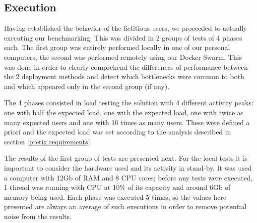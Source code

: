 \documentclass[12pt]{article}
\begin{document}
\subsection{Execution} \label{performance.execution} %


Having established the behavior of the fictitious users, we proceeded to actually executing our benchmarking.
This was divided in 2 groups of tests of 4 phases each.
The first group was entirely performed locally in one of our personal computers, the second was performed remotely using our Docker Swarm.
This was done in order to clearly comprehend the differences of performance between the 2 deployment methods and detect which bottlenecks were common to both 
and which appeared only in the second group (if any).

The 4 phases consisted in load testing the solution with 4 different activity peaks: one with half the expected load, one with the expected load, one with 
twice as many expected users and one with 10 times as many users.
These were defined a priori and the expected load was set according to the analysis described in section \ref{pretix.requirements}. 


The results of the first group of tests are presented next.
For the local tests it is important to consider the hardware used and its activity in stand-by.
It was used a computer with 12Gb of RAM and 8 CPU cores; before any tests were executed, 1 thread was running with CPU at 10\% of its capacity and around 6Gb 
of memory being used.
Each phase was executed 5 times, so the values here presented are always an average of such executions in order to remove potential noise from the results.
\end{document}
